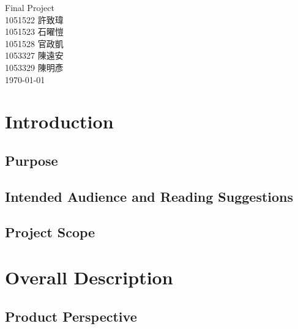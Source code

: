 \documentclass{scrreprt}
\date{}
\begin{document}
\begin{CJK}{UTF8}{nkai}
\begin{flushright}
    \begin{bfseries}
        \Huge{Final Project}\\

        \vspace{8cm}
       1051522 許致瑋\\
       \vspace{0.2cm}
       1051523 石曜愷\\
\vspace{0.2cm}
       1051528 官政凱\\
\vspace{0.2cm}
       1053327 陳遠安\\
\vspace{0.2cm}
       1053329 陳明彥\\

        \vspace{1cm}
        \today\\
    \end{bfseries}
\end{flushright}

\tableofcontents

\chapter{Introduction}

\section{Purpose}

\section{Intended Audience and Reading Suggestions}

\section{Project Scope}

\chapter{Overall Description}

\section{Product Perspective}


\end{CJK}
\end{document}
